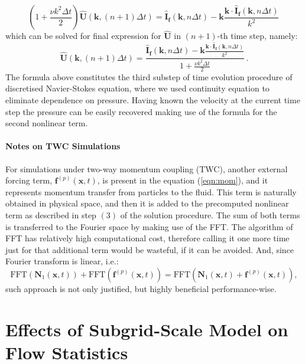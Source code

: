 \documentclass{pracamgren}
\begin{document}
\begin{enumerate}
$$ \left( 1 + \frac{\nu k^2 \Delta t}{2} \right) \mathbf{\hat{U}}(\mathbf{k}, (n+1) \Delta t) = \mathbf{\hat{I}_f}(\mathbf{k}, n \Delta t) - \mathbf{k} \frac{\mathbf{k} \cdot \mathbf{\hat{I}_f}(\mathbf{k}, n \Delta t)}{k^2} \, $$
which can be solved for final expression for $\mathbf{\hat{U}}$ in $(n+1)$-th time step, namely:
\begin{equation}
\mathbf{\hat{U}}(\mathbf{k}, (n+1) \Delta t) = \frac{\mathbf{\hat{I}_f}(\mathbf{k}, n \Delta t) - \mathbf{k} \frac{\mathbf{k} \cdot \mathbf{\hat{I}_f}(\mathbf{k}, n \Delta t)}{k^2}}{1 + \frac{\nu k^2 \Delta t}{2}} \, .
\end{equation}
The formula above constitutes the third substep of time evolution procedure of discretised Navier-Stokes equation, where we used continuity equation to eliminate dependence on pressure.
Having known the velocity at the current time step the pressure can be easily recovered making use of the formula for the second nonlinear term.
\end{enumerate}

\subsubsection{Notes on TWC Simulations}

For simulations under two-way momentum coupling (TWC), another external forcing term, $\mathbf{f}^{(p)}(\mathbf{x},t)$, is present in the equation (\ref{eqn:mom}), and it represents momentum transfer from particles to the fluid.
This term is naturally obtained in physical space, and then it is added to the precomputed nonlinear term as described in step $(3)$ of the solution procedure.
The sum of both terms is transferred to the Fourier space by making use of the FFT.
The algorithm of FFT has relatively high computational cost, therefore calling it one more time just for that additional term would be wasteful, if it can be avoided.
And, since Fourier transform is linear, i.e.:
$$\text{FFT}(\textbf{N}_1 (\mathbf{x},t)) + \text{FFT}(\textbf{f}^{(p)} (\mathbf{x},t)) = \text{FFT}(\textbf{N}_1 (\mathbf{x},t) +  \textbf{f}^{(p)} (\mathbf{x},t)), $$
such approach is not only justified, but highly beneficial performance-wise.




\chapter{Effects of Subgrid-Scale Model on Flow Statistics}
\label{app:sgs}
\end{document}
